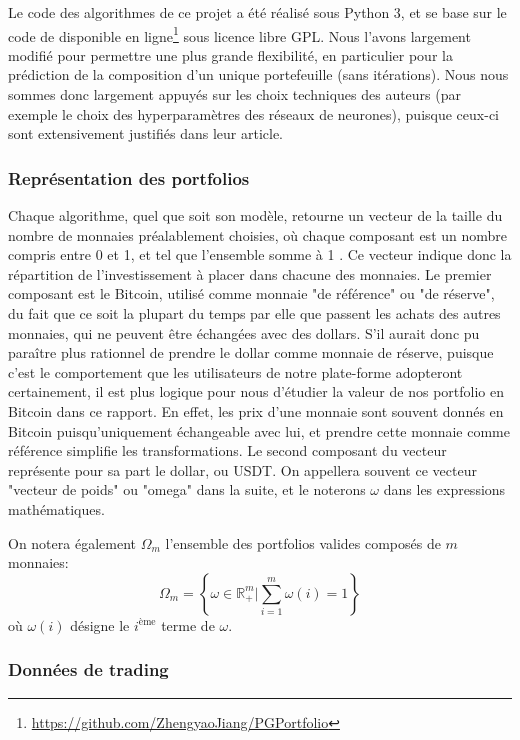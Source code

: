 \documentclass[a4paper, 10pt]{article}
\begin{document}
Le code des algorithmes de ce projet a été réalisé sous Python 3, et se base sur le code de \citet{Jiang2017} disponible en ligne\footnote{\url{https://github.com/ZhengyaoJiang/PGPortfolio}} sous licence libre GPL. Nous l'avons largement modifié pour permettre une plus grande flexibilité, en particulier pour la prédiction de la composition d'un unique portefeuille (sans itérations). Nous nous sommes donc largement appuyés sur les choix techniques des auteurs (par exemple le choix des hyperparamètres des réseaux de neurones), puisque ceux-ci sont extensivement justifiés dans leur article.

\subsubsection{Représentation des portfolios}
\label{sec:theorie_implem_rep}

Chaque algorithme, quel que soit son modèle, retourne un vecteur de la taille du nombre de monnaies préalablement choisies, où chaque composant est un nombre compris entre 0 et 1, et tel que l’ensemble somme à 1 . Ce vecteur indique donc la répartition de l'investissement à placer dans chacune des monnaies. Le premier composant est le Bitcoin, utilisé comme monnaie "de référence" ou "de réserve", du fait que ce soit la plupart du temps par elle que passent les achats des autres monnaies, qui ne peuvent être échangées avec des dollars. S'il aurait donc pu paraître plus rationnel de prendre le dollar comme monnaie de réserve, puisque c'est le comportement que les utilisateurs de notre plate-forme adopteront certainement, il est plus logique pour nous d'étudier la valeur de nos portfolio en Bitcoin dans ce rapport. En effet, les prix d'une monnaie sont souvent donnés en Bitcoin puisqu'uniquement échangeable avec lui, et prendre cette monnaie comme référence simplifie les transformations. Le second composant du vecteur représente pour sa part le dollar, ou USDT. On appellera souvent ce vecteur "vecteur de poids" ou "omega" dans la suite, et le noterons $\omega$ dans les expressions mathématiques.

On notera également $\Omega_m$ l'ensemble des portfolios valides composés de $m$ monnaies:
\begin{equation}
    \Omega_m = \left \{\omega \in \mathbb{R}_{+}^m \bigg| \sum_{i=1}^{m} \omega(i) = 1 \right \}
\end{equation}
où $\omega(i)$ désigne le $i^{\text{ème}}$ terme de $\omega$.

\subsubsection{Données de trading}
\label{sec:theorie_implem_data}
\end{document}
